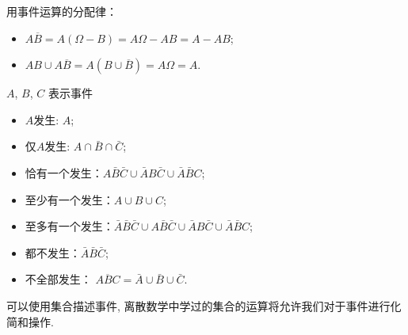\begin{solution}
    用事件运算的分配律：
    \begin{itemize}
        \item $A\overline{B}=A(\Omega-B)=A\Omega-AB=A-AB$;
        \item $AB\cup A\overline{B}=A(B\cup\overline{B})=A\Omega=A$.
    \end{itemize}
\end{solution}

\begin{example}
    $A$, $B$, $C$ 表示事件
    \begin{itemize}
        \item $A$发生: $A$;
        \item 仅$A$发生: $A\cap \bar{B}\cap \bar{C}$;
        \item 恰有一个发生：$A \bar B \bar C\cup \bar AB\bar C\cup \bar A\bar BC$;
        \item 至少有一个发生：$A\cup B\cup C$;
        \item 至多有一个发生：$\bar A\bar B\bar C\cup A \bar B \bar C \cup \bar AB\bar C\cup \bar A\bar BC$;
        \item 都不发生：$\bar A\bar B\bar C$;
        \item 不全部发生： $\overline{ABC}=\bar A\cup \bar B\cup \bar C$.
    \end{itemize}
\end{example}

\begin{takeaway}
{
    可以使用集合描述事件, 离散数学中学过的集合的运算将允许我们对于事件进行化简和操作.
}
\end{takeaway}